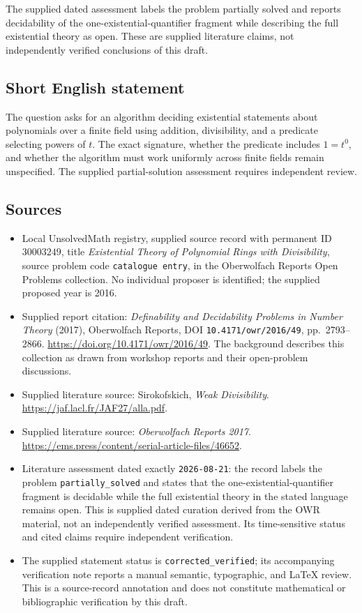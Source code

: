 \documentclass[11pt]{article}
\begin{document}
The supplied dated assessment labels the problem partially solved and reports decidability of the one-existential-quantifier fragment while describing the full existential theory as open. These are supplied literature claims, not independently verified conclusions of this draft.
\subsection{Short English statement}
The question asks for an algorithm deciding existential statements about polynomials over a finite field using addition, divisibility, and a predicate selecting powers of \(t\). The exact signature, whether the predicate includes \(1=t^0\), and whether the algorithm must work uniformly across finite fields remain unspecified. The supplied partial-solution assessment requires independent review.
\subsection{Sources}
\begin{itemize}
\item Local UnsolvedMath registry, supplied source record with permanent ID \(30003249\), title \emph{Existential Theory of Polynomial Rings with Divisibility}, source problem code \texttt{catalogue entry}, in the Oberwolfach Reports Open Problems collection. No individual proposer is identified; the supplied proposed year is 2016.
\item Supplied report citation: \emph{Definability and Decidability Problems in Number Theory} (2017), Oberwolfach Reports, DOI \texttt{10.4171/owr/2016/49}, pp.\ 2793--2866. \url{https://doi.org/10.4171/owr/2016/49}. The background describes this collection as drawn from workshop reports and their open-problem discussions.
\item Supplied literature source: Sirokofskich, \emph{Weak Divisibility}. \url{https://jaf.lacl.fr/JAF27/alla.pdf}.
\item Supplied literature source: \emph{Oberwolfach Reports 2017}. \url{https://ems.press/content/serial-article-files/46652}.
\item Literature assessment dated exactly \texttt{2026-08-21}: the record labels the problem \texttt{partially\_solved} and states that the one-existential-quantifier fragment is decidable while the full existential theory in the stated language remains open. This is supplied dated curation derived from the OWR material, not an independently verified assessment. Its time-sensitive status and cited claims require independent verification.
\item The supplied statement status is \texttt{corrected\_verified}; its accompanying verification note reports a manual semantic, typographic, and LaTeX review. This is a source-record annotation and does not constitute mathematical or bibliographic verification by this draft.
\end{itemize}
\end{document}
